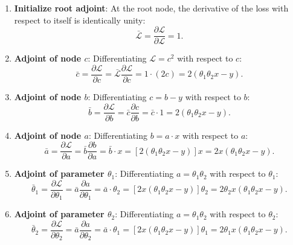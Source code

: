 \documentclass[../../../main.tex]{subfiles}
\begin{document}
\begin{enumerate}[label=Step \arabic*:]
    \item \textbf{Initialize root adjoint}: At the root node, the derivative of the loss with respect to itself is identically unity:
    \begin{equation}
    \bar{\mathcal{L}} = \frac{\partial \mathcal{L}}{\partial \mathcal{L}} = 1.
    \end{equation}
    \item \textbf{Adjoint of node $c$}: Differentiating $\mathcal{L} = c^2$ with respect to $c$:
    \begin{equation}
    \bar{c} = \frac{\partial \mathcal{L}}{\partial c} = \bar{\mathcal{L}} \frac{\partial \mathcal{L}}{\partial c} = 1 \cdot \left( 2c \right) = 2\left( \theta_1 \theta_2 x - y \right).
    \end{equation}
    \item \textbf{Adjoint of node $b$}: Differentiating $c = b - y$ with respect to $b$:
    \begin{equation}
    \bar{b} = \frac{\partial \mathcal{L}}{\partial b} = \bar{c} \frac{\partial c}{\partial b} = \bar{c} \cdot 1 = 2\left( \theta_1 \theta_2 x - y \right).
    \end{equation}
    \item \textbf{Adjoint of node $a$}: Differentiating $b = a \cdot x$ with respect to $a$:
    \begin{equation}
    \bar{a} = \frac{\partial \mathcal{L}}{\partial a} = \bar{b} \frac{\partial b}{\partial a} = \bar{b} \cdot x = \left[ 2\left( \theta_1 \theta_2 x - y \right) \right] x = 2x\left( \theta_1 \theta_2 x - y \right).
    \end{equation}
    \item \textbf{Adjoint of parameter $\theta_1$}: Differentiating $a = \theta_1 \theta_2$ with respect to $\theta_1$:
    \begin{equation}
    \bar{\theta}_1 = \frac{\partial \mathcal{L}}{\partial \theta_1} = \bar{a} \frac{\partial a}{\partial \theta_1} = \bar{a} \cdot \theta_2 = \left[ 2x\left( \theta_1 \theta_2 x - y \right) \right] \theta_2 = 2\theta_2 x \left( \theta_1 \theta_2 x - y \right).
    \end{equation}
    \item \textbf{Adjoint of parameter $\theta_2$}: Differentiating $a = \theta_1 \theta_2$ with respect to $\theta_2$:
    \begin{equation}
    \bar{\theta}_2 = \frac{\partial \mathcal{L}}{\partial \theta_2} = \bar{a} \frac{\partial a}{\partial \theta_2} = \bar{a} \cdot \theta_1 = \left[ 2x\left( \theta_1 \theta_2 x - y \right) \right] \theta_1 = 2\theta_1 x \left( \theta_1 \theta_2 x - y \right).
    \end{equation}
\end{enumerate}
\end{document}
